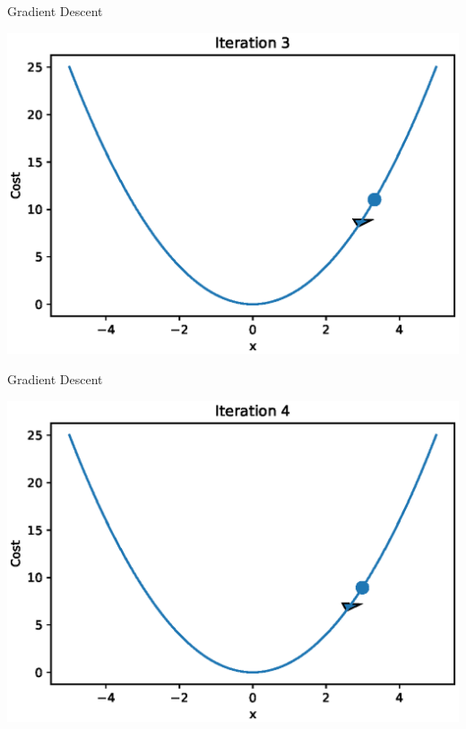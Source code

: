 \documentclass{beamer}
\begin{document}
\begin{frame}{Gradient Descent}
  \begin{center}
       \includegraphics[totalheight=6cm]{gradient-descent/iteration-3.eps}
   \end{center}
\end{frame}

\begin{frame}{Gradient Descent}
  \begin{center}
       \includegraphics[totalheight=6cm]{gradient-descent/iteration-4.eps}
   \end{center}
\end{frame}
\end{document}
